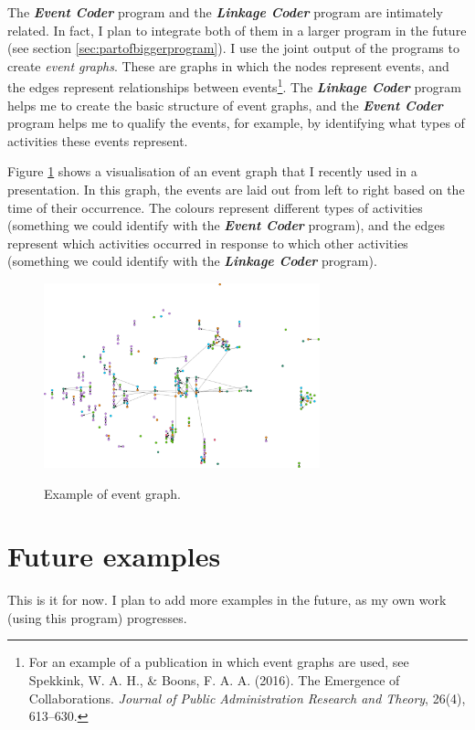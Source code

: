 \documentclass{memoir}
\begin{document}
The \textbf{\emph{Event Coder}} program and the \textbf{\emph{Linkage Coder}} program are intimately related. In fact, I plan to integrate both of them in a larger program in the future (see section \ref{sec:partofbiggerprogram}). I use the joint output of the programs to create \emph{event graphs}. These are graphs in which the nodes represent events, and the edges represent relationships between events\footnote{For an example of a publication in which event graphs are used, see Spekkink, W. A. H., \& Boons, F. A. A. (2016). The Emergence of Collaborations. \emph{Journal of Public Administration Research and Theory}, 26(4), 613–630.}. The \textbf{\emph{Linkage Coder}} program helps me to create the basic structure of event graphs, and the \textbf{\emph{Event Coder}} program helps me to qualify the events, for example, by identifying what types of activities these events represent.

Figure \ref{fig:eventgraph} shows a visualisation of an event graph that I recently used in a presentation. In this graph, the events are laid out from left to right based on the time of their occurrence. The colours represent different types of activities (something we could identify with the \emph{\textbf{Event Coder}} program), and the edges represent which activities occurred in response to which other activities (something we could identify with the \textbf{\emph{Linkage Coder}} program).

\begin{figure}[h!]
  \centering
  \caption{Example of event graph.}
  \includegraphics[width=80mm]{Diagram_6.png}
  \label{fig:eventgraph}
\end{figure}

\section{Future examples}
\label{sec:futureexamples}

This is it for now. I plan to add more examples in the future, as my own work (using this program) progresses. 
\end{document}
